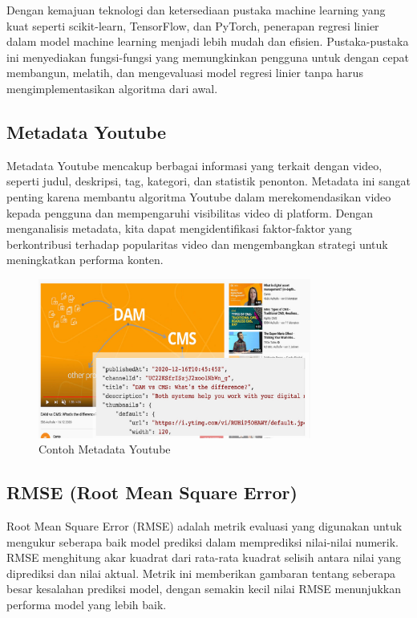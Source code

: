 
Dengan kemajuan teknologi dan ketersediaan pustaka machine learning yang kuat seperti scikit-learn, TensorFlow, dan PyTorch, penerapan regresi linier dalam model machine learning menjadi lebih mudah dan efisien. Pustaka-pustaka ini menyediakan fungsi-fungsi yang memungkinkan pengguna untuk dengan cepat membangun, melatih, dan mengevaluasi model regresi linier tanpa harus mengimplementasikan algoritma dari awal.


\subsection{Metadata Youtube}
Metadata Youtube mencakup berbagai informasi yang terkait dengan video, seperti judul, deskripsi, tag, kategori, dan statistik penonton. Metadata ini sangat penting karena membantu algoritma Youtube dalam merekomendasikan video kepada pengguna dan mempengaruhi visibilitas video di platform. Dengan menganalisis metadata, kita dapat mengidentifikasi faktor-faktor yang berkontribusi terhadap popularitas video dan mengembangkan strategi untuk meningkatkan performa konten.

\begin{figure}[ht]
    \centering
    \includegraphics[width=0.8\textwidth]{gambar/youtube-metadata.png}
    \caption{Contoh Metadata Youtube}
    \label{fig:metadata_youtube}
\end{figure}

\subsection{RMSE (Root Mean Square Error)}
Root Mean Square Error (RMSE) adalah metrik evaluasi yang digunakan untuk mengukur seberapa baik model prediksi dalam memprediksi nilai-nilai numerik. RMSE menghitung akar kuadrat dari rata-rata kuadrat selisih antara nilai yang diprediksi dan nilai aktual. Metrik ini memberikan gambaran tentang seberapa besar kesalahan prediksi model, dengan semakin kecil nilai RMSE menunjukkan performa model yang lebih baik.

